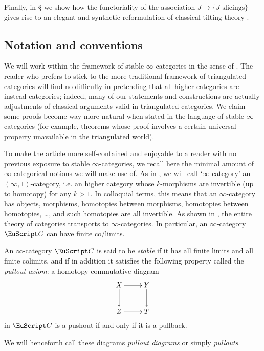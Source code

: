Finally, in § we show how the functoriality of the association $J\mapsto \{\text{$J$-slicings}\}$ gives rise to an elegant and synthetic reformulation of classical tilting theory \cite{happel}.
{\color{green!40!black}
\subsection{Notation and conventions}
We will work within the framework of stable $\infty$-categories in the sense of \cite{LurieHA}. The reader who prefers to stick to the more traditional framework of triangulated categories will find no difficulty in pretending that all higher categories are instead categories; indeed, many of our statements and constructions are actually adjustments of classical arguments valid in triangulated categories. We claim some proofs become way more natural when stated in the language of stable $\infty$-categories (for example, theorems whose proof involves a certain universal property unavailable in the triangulated world).

To make the article more self\hyp{}contained and enjoyable to a reader with no previous exposure to stable $\infty$-categories, we recall here the minimal amount of $\infty$-categorical notions we will make use of. As in \cite{HTT}, we will call `$\infty$-category' an $(\infty,1)$-category, i.e. an higher category whose $k$-morphisms are invertible (up to homotopy) for any $k>1$. In colloquial terms, this means that an $\infty$-category has objects, morphisms, homotopies between morphisms, homotopies between homotopies, \dots, and such homotopies are all invertible. As shown in \cite{HTT, Joyal2008}, the entire theory of categories transports to $\infty$-categories. In particular, an $\infty$-category $\C$ can have finite co/limits.
\begin{definition*}
An $\infty$-category $\C$ is said to be \emph{stable}  if it has all finite limits and all finite colimits, and if in addition it satisfies the following property called the \emph{pullout axiom}:
a homotopy commutative diagram
\[
\xymatrix{X\ar[r]\ar[d]&Y\ar[d]\\
Z\ar[r]&T
}
\]
in $\C$ is a pushout if and only if it is a pullback. 
\end{definition*}
We will henceforth call these diagrams \emph{pullout diagrams} or simply \emph{pullouts}.

}
